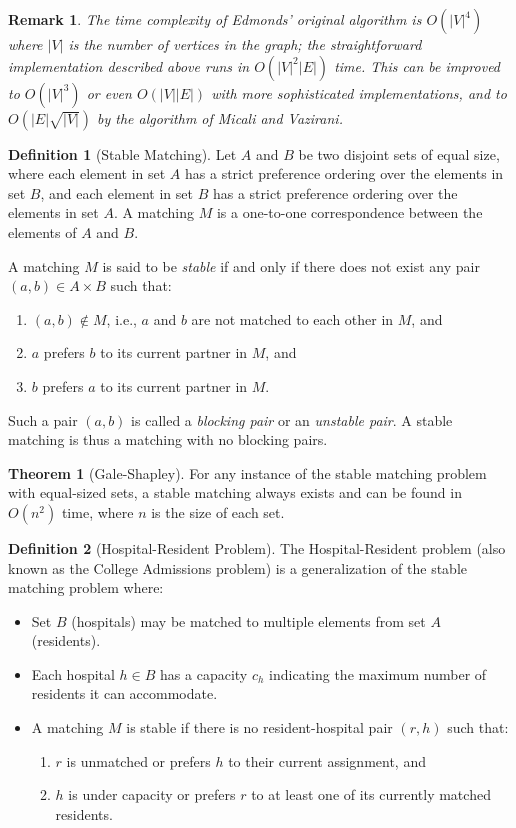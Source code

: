 \documentclass{article}
\newtheorem{remark}{Remark}
\theoremstyle{definition}
\newtheorem{theorem}{Theorem}
\newtheorem{definition}{Definition}
\begin{document}
\begin{remark}
    The time complexity of Edmonds' original algorithm is $O(|V|^4)$ where $|V|$ is the number of vertices in the graph; the straightforward implementation described above runs in $O(|V|^2|E|)$ time. This can be improved to $O(|V|^3)$ or even $O(|V||E|)$ with more sophisticated implementations, and to $O(|E|\sqrt{|V|})$ by the algorithm of Micali and Vazirani.
\end{remark}

\begin{definition}[Stable Matching]
Let $A$ and $B$ be two disjoint sets of equal size, where each element in set $A$ has a strict preference ordering over the elements in set $B$, and each element in set $B$ has a strict preference ordering over the elements in set $A$. A matching $M$ is a one-to-one correspondence between the elements of $A$ and $B$.

A matching $M$ is said to be \textit{stable} if and only if there does not exist any pair $(a, b) \in A \times B$ such that:
\begin{enumerate}
  \item $(a, b) \notin M$, i.e., $a$ and $b$ are not matched to each other in $M$, and
  \item $a$ prefers $b$ to its current partner in $M$, and
  \item $b$ prefers $a$ to its current partner in $M$.
\end{enumerate}

Such a pair $(a, b)$ is called a \textit{blocking pair} or an \textit{unstable pair}. A stable matching is thus a matching with no blocking pairs.
\end{definition}

\begin{theorem}[Gale-Shapley]
For any instance of the stable matching problem with equal-sized sets, a stable matching always exists and can be found in $O(n^2)$ time, where $n$ is the size of each set.
\end{theorem}

\begin{definition}[Hospital-Resident Problem]
The Hospital-Resident problem (also known as the College Admissions problem) is a generalization of the stable matching problem where:
\begin{itemize}
  \item Set $B$ (hospitals) may be matched to multiple elements from set $A$ (residents).
  \item Each hospital $h \in B$ has a capacity $c_h$ indicating the maximum number of residents it can accommodate.
  \item A matching $M$ is stable if there is no resident-hospital pair $(r, h)$ such that:
  \begin{enumerate}
    \item $r$ is unmatched or prefers $h$ to their current assignment, and
    \item $h$ is under capacity or prefers $r$ to at least one of its currently matched residents.
  \end{enumerate}
\end{itemize}
\end{definition}
\end{document}
